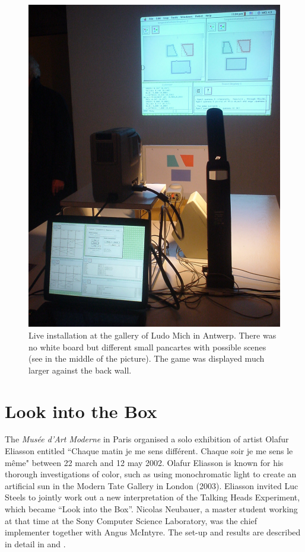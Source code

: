 \begin{figure}[htbp]
  \centerline{\includegraphics[width=.80\textwidth]{chap9/figs/mich-gallery}}
\caption{\label{fig:mich} 
Live installation at the gallery of Ludo Mich in Antwerp. There was no white board but different 
small pancartes with possible scenes (see in the middle of the picture). The game was displayed much larger against
the back wall.}
\end{figure}

\section{Look into the Box} 

The {\itshape Mus\'ee d'Art Moderne} in Paris organised a solo exhibition of artist Olafur Eliasson entitled 
``Chaque matin je me sens diff\'erent. Chaque soir je me sens le m\^eme" between 
22 march and 12 may 2002.\cite{Scherf:2002} Olafur Eliasson is known for his thorough 
investigations of color, such as using monochromatic light to create an artificial sun in the Modern Tate
Gallery in London (2003). Eliasson invited Luc Steels to jointly work out a new interpretation of the 
Talking Heads Experiment, which became ``Look into the Box''. Nicolas Neubauer, a master student working at 
that time at the Sony Computer Science Laboratory, was the chief implementer together with Angus McIntyre.  
The set-up and results are described in detail in \cite{Steels:2004} and \cite{Neubauer:2004}.

